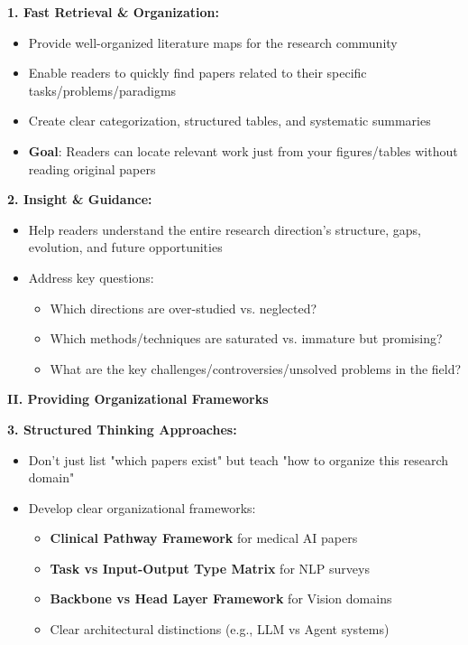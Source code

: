 \documentclass[11pt,a4paper]{article}
\begin{document}
\textbf{1. Fast Retrieval \& Organization:}
\begin{itemize}
    \item Provide well-organized literature maps for the research community
    \item Enable readers to quickly find papers related to their specific tasks/problems/paradigms
    \item Create clear categorization, structured tables, and systematic summaries
    \item \textbf{Goal}: Readers can locate relevant work just from your figures/tables without reading original papers
\end{itemize}

\textbf{2. Insight \& Guidance:}
\begin{itemize}
    \item Help readers understand the entire research direction's structure, gaps, evolution, and future opportunities
    \item Address key questions:
    \begin{itemize}
        \item Which directions are over-studied vs. neglected?
        \item Which methods/techniques are saturated vs. immature but promising?
        \item What are the key challenges/controversies/unsolved problems in the field?
    \end{itemize}
\end{itemize}

\textbf{II. Providing Organizational Frameworks}

\textbf{3. Structured Thinking Approaches:}
\begin{itemize}
    \item Don't just list "which papers exist" but teach "how to organize this research domain"
    \item Develop clear organizational frameworks:
    \begin{itemize}
        \item \textbf{Clinical Pathway Framework} for medical AI papers
        \item \textbf{Task vs Input-Output Type Matrix} for NLP surveys
        \item \textbf{Backbone vs Head Layer Framework} for Vision domains
        \item Clear architectural distinctions (e.g., LLM vs Agent systems)
    \end{itemize}
\end{itemize}
\end{document}
